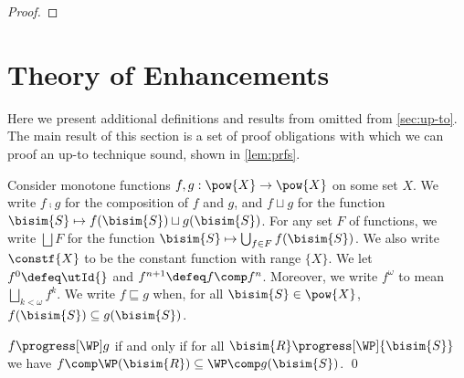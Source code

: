 \begin{proof}
\end{proof}

\section{Theory of Enhancements}\label{sec:enhancements}

Here we present additional definitions and results from \cite{PousS11,PousCompanion} omitted from \cref{sec:up-to}.
The main result of this section is a set of proof obligations with which we can proof an up-to technique sound, shown in
\cref{lem:prfs}.

\begin{definition}
  Consider monotone functions $f,g: \pow{X}\rightarrow \pow{X}$ on some set $X$.
  We write $f\comp g$ for the composition of $f$ and $g$, and
  $f \sqcup g$ for the function $\bisim{S} \mapsto f(\bisim{S}) \sqcup g(\bisim{S})$.
  For any set $F$ of functions, we write $\bigsqcup F$ for the function $\bisim{S} \mapsto \bigcup_{f\in F}f(\bisim{S})$.
  We also write $\constf{X}$ to be the constant function with range $\{X\}$.
  We let $f^0 \defeq \utId{}$ and $f^{n+1} \defeq f\comp f^{n}$. Moreover, we write
  $f^{\omega}$ to mean $\bigsqcup_{k<\omega} f^{k}$.
  We write $f\sqsubseteq g$ when, for all $\bisim{S}\in\pow{X}$, $f(\bisim{S}) \subseteq g(\bisim{S})$.
\end{definition}


\begin{lemma} \label{lem:compat-alternative}%
  $f\progress[\WP]g$ if and only if 
  for all ${\bisim{R}}\progress[\WP]{\bisim{S}}$ we have $f\comp\WP(\bisim{R}) \subseteq \WP\comp g(\bisim{S})$.
  \qed
\end{lemma}


